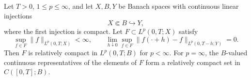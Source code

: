 Let $T>0$, $1\le p\le\infty$, and let $X,B,Y$ be Banach spaces with continuous linear injections
\[
X\Subset B\hookrightarrow Y,
\]
where the first injection is compact. Let $F\subset L^p(0,T;X)$ satisfy
\[
\sup_{f\in F}\|f\|_{L^p(0,T;X)}<\infty,
\qquad
\lim_{h\downarrow0}\sup_{f\in F}\|f(\cdot+h)-f\|_{L^p(0,T-h;Y)}=0.
\]
Then $F$ is relatively compact in $L^p(0,T;B)$ for $p<\infty$.
For $p=\infty$, the $B$-valued continuous representatives of the elements of $F$ form a relatively compact set in $C([0,T];B)$.